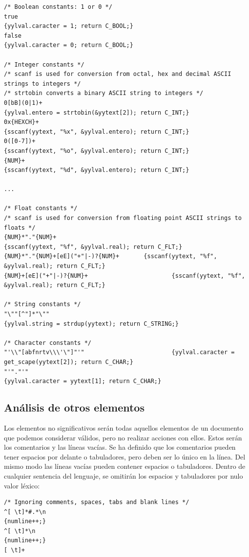 \documentclass[a4paper,10pt]{article}
\begin{document}
\begin{lstlisting}
/* Boolean constants: 1 or 0 */
true																{yylval.caracter = 1; return C_BOOL;}
false																{yylval.caracter = 0; return C_BOOL;}

/* Integer constants */
/* scanf is used for conversion from octal, hex and decimal ASCII strings to integers */
/* strtobin converts a binary ASCII string to integers */
0[bB](0|1)+													{yylval.entero = strtobin(&yytext[2]); return C_INT;}
0x{HEXCH}+													{sscanf(yytext, "%x", &yylval.entero); return C_INT;}
0([0-7])+														{sscanf(yytext, "%o", &yylval.entero); return C_INT;}
{NUM}+															{sscanf(yytext, "%d", &yylval.entero); return C_INT;}

...

/* Float constants */
/* scanf is used for conversion from floating point ASCII strings to floats */
{NUM}*"."{NUM}+											{sscanf(yytext, "%f", &yylval.real); return C_FLT;}
{NUM}*"."{NUM}+[eE]("+"|-)?{NUM}+		{sscanf(yytext, "%f", &yylval.real); return C_FLT;}
{NUM}+[eE]("+"|-)?{NUM}+						{sscanf(yytext, "%f", &yylval.real); return C_FLT;}

/* String constants */
"\""[^"]*"\""												{yylval.string = strdup(yytext); return C_STRING;}

/* Character constants */
"'\\"[abfnrtv\\\'\"]"'"							{yylval.caracter = get_scape(yytext[2]); return C_CHAR;}
"'"."'"															{yylval.caracter = yytext[1]; return C_CHAR;}

\end{lstlisting}

\subsection{Análisis de otros elementos}

Los elementos no significativos serán todas aquellos elementos de un documento que podemos considerar válidos, pero no realizar acciones con ellos. Estos serán los comentarios y las líneas vacías. Se ha definido que los comentarios pueden tener espacios por delante o tabuladores, pero deben ser lo único en la línea. Del mismo modo las líneas vacías pueden contener espacios o tabuladores. Dentro de cualquier sentencia del lenguaje, se omitirán los espacios y tabuladores por nulo valor léxico: 

\begin{lstlisting}
/* Ignoring comments, spaces, tabs and blank lines */
^[ \t]*#.*\n												{numline++;}
^[ \t]*\n														{numline++;}
[ \t]+						 									
\end{lstlisting}
\end{document}

